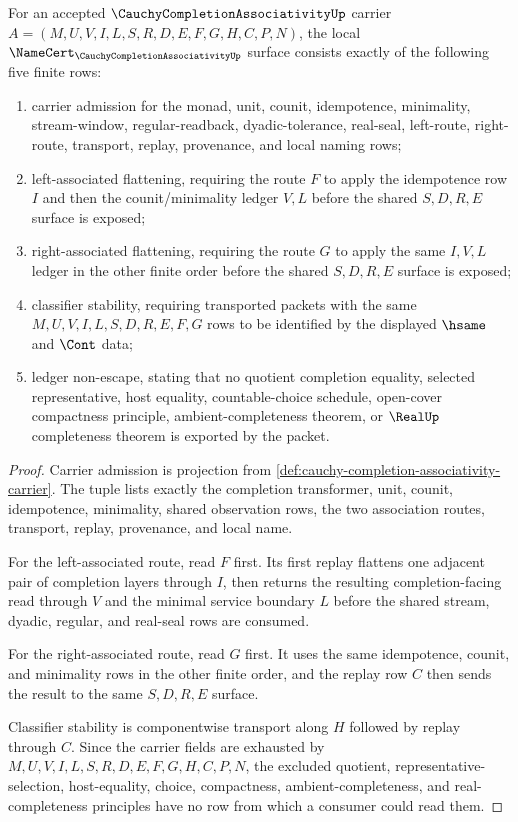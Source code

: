 \begin{theorem}
\label{thm:cauchy-completion-associativity-namecert-obligations}
For an accepted $\CauchyCompletionAssociativityUp$ carrier $A=(M,U,V,I,L,S,R,D,E,F,G,H,C,P,N)$, the local $\NameCert_{\CauchyCompletionAssociativityUp}$ surface consists exactly of the following five finite rows:
\begin{enumerate}
\item carrier admission for the monad, unit, counit, idempotence, minimality, stream-window, regular-readback, dyadic-tolerance, real-seal, left-route, right-route, transport, replay, provenance, and local naming rows;
\item left-associated flattening, requiring the route $F$ to apply the idempotence row $I$ and then the counit/minimality ledger $V,L$ before the shared $S,D,R,E$ surface is exposed;
\item right-associated flattening, requiring the route $G$ to apply the same $I,V,L$ ledger in the other finite order before the shared $S,D,R,E$ surface is exposed;
\item classifier stability, requiring transported packets with the same $M,U,V,I,L,S,D,R,E,F,G$ rows to be identified by the displayed $\hsame$ and $\Cont$ data;
\item ledger non-escape, stating that no quotient completion equality, selected representative, host equality, countable-choice schedule, open-cover compactness principle, ambient-completeness theorem, or $\RealUp$ completeness theorem is exported by the packet.
\end{enumerate}
\end{theorem}
\begin{proof}
Carrier admission is projection from \autoref{def:cauchy-completion-associativity-carrier}. The tuple lists exactly the completion transformer, unit, counit, idempotence, minimality, shared observation rows, the two association routes, transport, replay, provenance, and local name.

For the left-associated route, read $F$ first. Its first replay flattens one adjacent pair of completion layers through $I$, then returns the resulting completion-facing read through $V$ and the minimal service boundary $L$ before the shared stream, dyadic, regular, and real-seal rows are consumed.

For the right-associated route, read $G$ first. It uses the same idempotence, counit, and minimality rows in the other finite order, and the replay row $C$ then sends the result to the same $S,D,R,E$ surface.

Classifier stability is componentwise transport along $H$ followed by replay through $C$. Since the carrier fields are exhausted by $M,U,V,I,L,S,R,D,E,F,G,H,C,P,N$, the excluded quotient, representative-selection, host-equality, choice, compactness, ambient-completeness, and real-completeness principles have no row from which a consumer could read them.
\end{proof}
